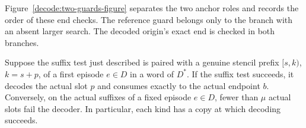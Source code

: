 Figure~\ref{decode:two-guards-figure} separates the two anchor roles and
records the order of these end checks. The reference guard belongs only
to the branch with an absent larger search. The decoded origin's exact
end is checked in both branches.

\FloatBarrier

\begin{lemma}\label{decode:decoder}
Suppose the suffix test just described is paired with a genuine
stencil prefix $[s,k)$, $k=s+p$, of a first episode $e\in D$ in a
word of $D^*$.
If the suffix test succeeds, it decodes the actual slot $p$ and
consumes exactly to the actual endpoint $b$.
Conversely, on the actual suffixes of a fixed episode $e\in D$,
fewer than $\mu$ actual slots fail the decoder.  In particular,
each kind has a copy at which decoding succeeds.
\end{lemma}

